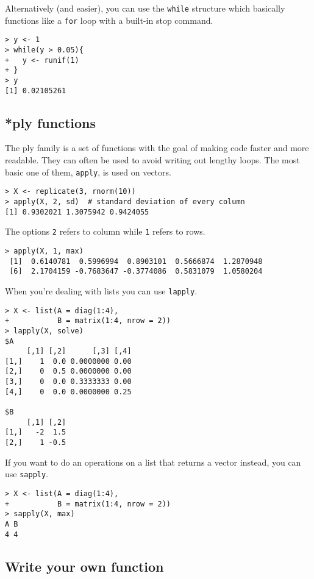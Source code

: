 Alternatively (and easier), you can use the \texttt{while} structure which basically functions like a \texttt{for} loop with a built-in stop command.

\begin{lstlisting}
> y <- 1
> while(y > 0.05){
+   y <- runif(1)
+ }
> y
[1] 0.02105261
\end{lstlisting}

\subsection{*ply functions}

The ply family is a set of functions with the goal of making code faster and more readable. They can often be used to avoid writing out lengthy loops. The most basic one of them, \texttt{apply}, is used on vectors.

\begin{lstlisting}
> X <- replicate(3, rnorm(10))
> apply(X, 2, sd)  # standard deviation of every column
[1] 0.9302021 1.3075942 0.9424055
\end{lstlisting}

The options \texttt{2} refers to column while \texttt{1} refers to rows.

\begin{lstlisting}
> apply(X, 1, max) 
 [1]  0.6140781  0.5996994  0.8903101  0.5666874  1.2870948
 [6]  2.1704159 -0.7683647 -0.3774086  0.5831079  1.0580204
\end{lstlisting}

When you're dealing with lists you can use \texttt{lapply}.

\begin{lstlisting}
> X <- list(A = diag(1:4),
+           B = matrix(1:4, nrow = 2))
> lapply(X, solve)
$A
     [,1] [,2]      [,3] [,4]
[1,]    1  0.0 0.0000000 0.00
[2,]    0  0.5 0.0000000 0.00
[3,]    0  0.0 0.3333333 0.00
[4,]    0  0.0 0.0000000 0.25

$B
     [,1] [,2]
[1,]   -2  1.5
[2,]    1 -0.5
\end{lstlisting}

If you want to do an operations on a list that returns a vector instead, you can use \texttt{sapply}.

\begin{lstlisting}
> X <- list(A = diag(1:4),
+           B = matrix(1:4, nrow = 2))
> sapply(X, max)
A B 
4 4 
\end{lstlisting}

\subsection{Write your own function} 

